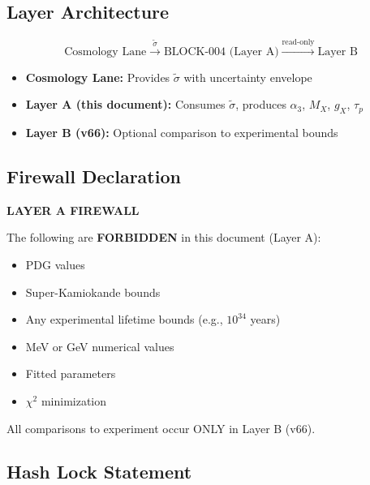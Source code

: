 \documentclass[11pt,letterpaper]{article}
\newcommand{\st}{\tilde{\sigma}}
\begin{document}
\subsection{Layer Architecture}
\label{subsec:layer-arch}

\begin{equation}
\boxed{
\text{Cosmology Lane} \xrightarrow{\st} \text{BLOCK-004 (Layer A)} \xrightarrow{\text{read-only}} \text{Layer B}
}
\label{eq:layer-flow}
\end{equation}

\begin{itemize}
\item \textbf{Cosmology Lane:} Provides $\st$ with uncertainty envelope
\item \textbf{Layer A (this document):} Consumes $\st$, produces $\alpha_3$, $M_X$, $g_X$, $\tau_p$
\item \textbf{Layer B (v66):} Optional comparison to experimental bounds
\end{itemize}

\subsection{Firewall Declaration}
\label{subsec:firewall-decl}

\begin{nofitbox}
\textbf{LAYER A FIREWALL}

The following are \textbf{FORBIDDEN} in this document (Layer A):
\begin{itemize}[noitemsep]
\item PDG values
\item Super-Kamiokande bounds
\item Any experimental lifetime bounds (e.g., $10^{34}$ years)
\item MeV or GeV numerical values
\item Fitted parameters
\item $\chi^2$ minimization
\end{itemize}

All comparisons to experiment occur ONLY in Layer B (v66).
\end{nofitbox}

\subsection{Hash Lock Statement}
\label{subsec:hash-lock}
\end{document}
